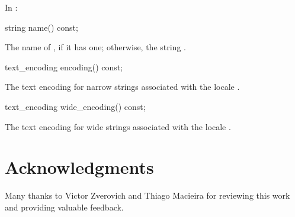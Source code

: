 \documentclass{wg21}
\begin{document}
In :

\begin{itemdecl}
string name() const;
\end{itemdecl}

\begin{itemdescr}
\pnum
\returns
The name of
,
if it has one; otherwise, the string .
\end{itemdescr}

\begin{addedblock}
\begin{itemdecl}
text_encoding encoding() const;
\end{itemdecl}

\begin{itemdescr}
  \returns The text encoding for narrow strings associated with the locale
  .
\end{itemdescr}

\begin{itemdecl}
text_encoding wide_encoding() const;
\end{itemdecl}

\begin{itemdescr}
  \returns The text encoding for wide strings associated with the locale
  .
\end{itemdescr}
\end{addedblock}

\section{Acknowledgments}

Many thanks to Victor Zverovich and Thiago Macieira for reviewing this work and providing valuable feedback.
\end{document}
